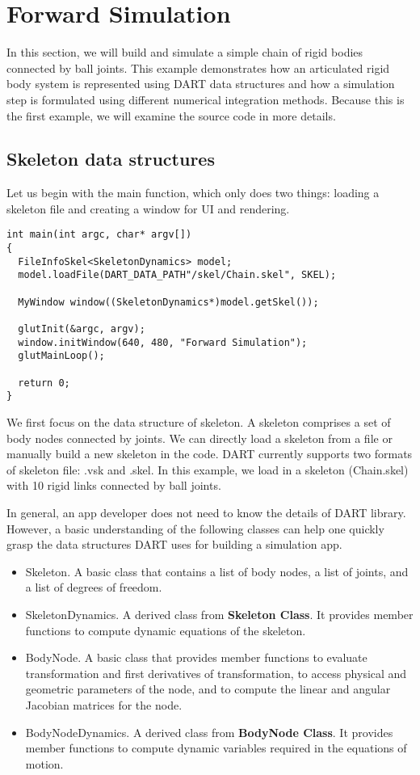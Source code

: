 \section{Forward Simulation}
In this section, we will build and simulate a simple chain of rigid
bodies connected by ball joints. This example demonstrates how an
articulated rigid body system is represented using DART data
structures and how a simulation step is formulated using different
numerical integration methods. Because this is the first example, we
will examine the source code in more details.

\subsection{Skeleton data structures}
Let us begin with the main function, which only does two things:
loading a skeleton file and creating a window for UI and rendering. 

\ttfamily
\begin{lstlisting}[caption=Main.cpp]
int main(int argc, char* argv[])
{
  FileInfoSkel<SkeletonDynamics> model;
  model.loadFile(DART_DATA_PATH"/skel/Chain.skel", SKEL);

  MyWindow window((SkeletonDynamics*)model.getSkel());
  
  glutInit(&argc, argv);
  window.initWindow(640, 480, "Forward Simulation");
  glutMainLoop();

  return 0;
}
\end{lstlisting}
\rmfamily 

We first focus on the data structure of skeleton. A skeleton comprises
a set of body nodes connected by joints. We can directly load a
skeleton from a file or manually build a new skeleton in the
code. DART currently supports two formats of skeleton file: .vsk and
.skel. In this example, we load in a skeleton (Chain.skel) with 10
rigid links connected by ball joints.

In general, an app developer does not need to know the details of DART
library. However, a basic understanding of the following classes can
help one quickly grasp the data structures DART uses for building a
simulation app.

\begin{itemize}
\item{Skeleton.} A basic class that contains a list of body nodes, a
  list of joints, and a list of degrees of freedom. 
\item{SkeletonDynamics.} A derived class from \textbf{Skeleton
    Class}. It provides member functions to compute dynamic equations
  of the skeleton.
\item{BodyNode.} A basic class that provides member functions to evaluate
  transformation and first derivatives of transformation, to access
  physical and geometric parameters of the node, and to compute the
  linear and angular Jacobian matrices for the node.
\item{BodyNodeDynamics.} A derived class from \textbf{BodyNode
    Class}. It provides member functions to compute dynamic variables
  required in the equations of motion.
\end{itemize}

